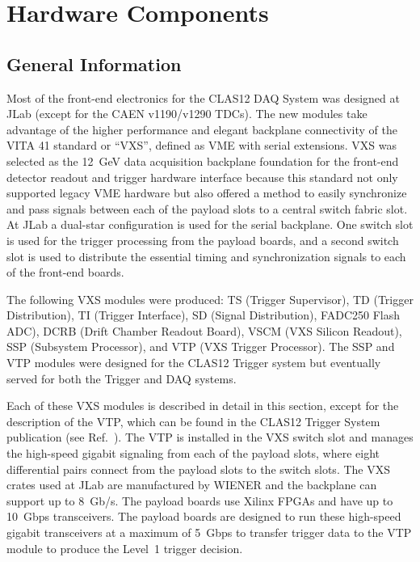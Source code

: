 \section{Hardware Components}

\subsection{General Information}

Most of the front-end electronics for the CLAS12 DAQ System was designed at JLab (except for the CAEN
v1190/v1290 TDCs). The new modules take advantage of the higher performance and elegant backplane connectivity
of the VITA 41 standard or ``VXS'', defined as VME with serial extensions.  VXS was selected as the 12~GeV data
acquisition backplane foundation for the front-end detector readout and trigger hardware interface because this
standard not only supported legacy VME hardware but also offered a method to easily synchronize and pass signals
between each of the payload slots to a central switch fabric slot. At JLab a dual-star configuration is used for the
serial backplane. One switch slot is used for the trigger processing from the payload boards, and a second switch slot
is used to distribute the essential timing and synchronization signals to each of the front-end boards.

The following VXS modules were produced: TS (Trigger Supervisor), TD (Trigger Distribution), TI (Trigger Interface),
SD (Signal Distribution), FADC250 Flash ADC), DCRB (Drift Chamber Readout Board), VSCM (VXS Silicon Readout),
SSP (Subsystem Processor), and VTP (VXS Trigger Processor). The SSP and VTP modules were designed for the
CLAS12 Trigger system but eventually served for both the Trigger and DAQ systems.

Each of these VXS modules is described in detail in this section, except for the description of the VTP, which can be
found in the CLAS12 Trigger System publication (see Ref.~\cite{trig-ref}). The VTP is installed in the VXS switch slot
and manages the high-speed gigabit signaling from each of the payload slots, where eight differential pairs connect
from the payload slots to the switch slots. The VXS crates used at JLab are manufactured by WIENER and the
backplane can support up to 8~Gb/s. The payload boards use Xilinx FPGAs and have up to 10~Gbps transceivers. The
payload boards are designed to run these high-speed gigabit transceivers at a maximum of 5~Gbps to transfer trigger
data to the VTP module to produce the Level~1 trigger decision.


